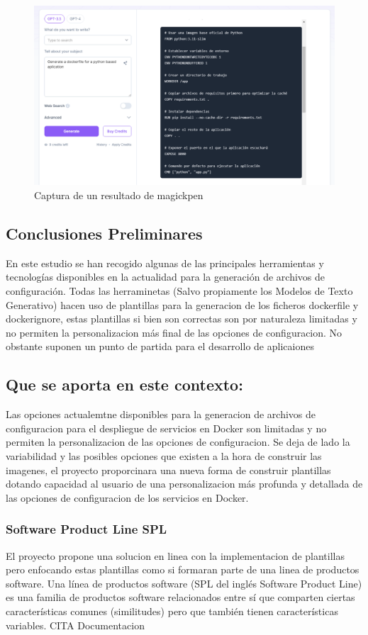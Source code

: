 \documentclass[12pt, a4paper, twoside]{article}
\begin{document}
\begin{figure}[ht]
	\centering
		\includegraphics[width=1\textwidth]{MagickPen.png}
	\caption{Captura de un resultado de magickpen}
\end{figure}


\newpage
\subsection{Conclusiones Preliminares}
En este estudio se han recogido algunas de las principales herramientas y tecnologías disponibles en la actualidad para la generación de archivos de configuración.
Todas las herraminetas (Salvo propiamente los Modelos de Texto Generativo) hacen uso de plantillas para la generacion de los ficheros dockerfile y dockerignore, estas plantillas si bien son correctas son por naturaleza limitadas y no permiten la personalizacion más final de las opciones de configuracion.
No obstante suponen un punto de partida para el desarrollo de aplicaiones 

\subsection{Que se aporta en este contexto:}
Las opciones actualemtne disponibles para la generacion de archivos de configuracion para el despliegue de servicios en Docker son limitadas y no permiten la personalizacion de las opciones de configuracion.
Se deja de lado la variabilidad y las posibles opciones que existen a la hora de construir las imagenes, el proyecto proporcinara una nueva forma de construir plantillas dotando capacidad al usuario de una personalizacion
más profunda y detallada de las opciones de configuracion de los servicios en Docker.
\subsubsection{Software Product Line SPL}
El proyecto propone una solucion en linea con la implementacion de plantillas pero enfocando estas plantillas como si formaran parte de una linea de productos software.
Una línea de productos software (SPL del inglés Software Product Line) es una familia de productos software 
relacionados entre sí que comparten ciertas características comunes (similitudes) pero que también tienen 
características variables. CITA Documentacion
\end{document}
